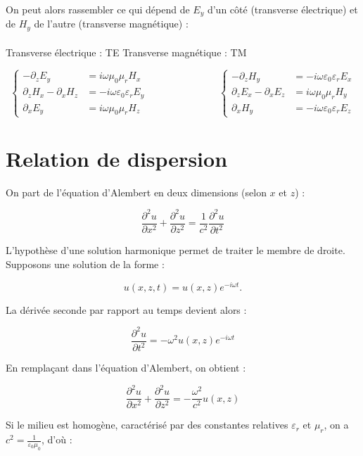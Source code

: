 \documentclass{article}
\begin{document}
On peut alors rassembler ce qui dépend de \(E_y\) d'un côté (transverse électrique) et de \(H_y\) de l'autre (transverse magnétique) : 
\\ \\
{Transverse électrique : TE} \hfill {Transverse magnétique : TM}

\[
\left\{
\begin{aligned}
-\partial_z E_y &= i\omega \mu_0 \mu_r H_x \\
\partial_z H_x - \partial_x H_z &= -i\omega \varepsilon_0 \varepsilon_r E_y \\
\partial_x E_y &= i\omega \mu_0 \mu_r H_z
\end{aligned}
\right.
\hspace{3cm}
\left\{
\begin{aligned}
-\partial_z H_y &= -i\omega \varepsilon_0 \varepsilon_r E_x \\
\partial_z E_x - \partial_x E_z &= i\omega \mu_0 \mu_r H_y \\
\partial_x H_y &= -i\omega \varepsilon_0 \varepsilon_r E_z
\end{aligned}
\right.
\]

\section*{Relation de dispersion}

On part de l'équation d’Alembert en deux dimensions (selon \(x\) et \(z\)) :

\[
\frac{\partial^2 u}{\partial x^2} + \frac{\partial^2 u}{\partial z^2} = \frac{1}{c^2} \frac{\partial^2 u}{\partial t^2}
\]

L'hypothèse d'une solution harmonique permet de traiter le membre de droite. Supposons une solution de la forme :

\[
u(x, z, t) = u(x, z)  e^{-i \omega t}.
\]

La dérivée seconde par rapport au temps devient alors :

\[
\frac{\partial^2 u}{\partial t^2} = -\omega^2 u(x, z)  e^{-i \omega t}
\]

En remplaçant dans l’équation d’Alembert, on obtient :

\[
\frac{\partial^2 u}{\partial x^2} + \frac{\partial^2 u}{\partial z^2} = -\frac{\omega^2}{c^2} u(x, z)
\]

Si le milieu est homogène, caractérisé par des constantes relatives \( \varepsilon_r \) et \( \mu_r \), on a \( c^2 = \frac{1}{\varepsilon_0 \mu_0} \), d’où :
\end{document}

